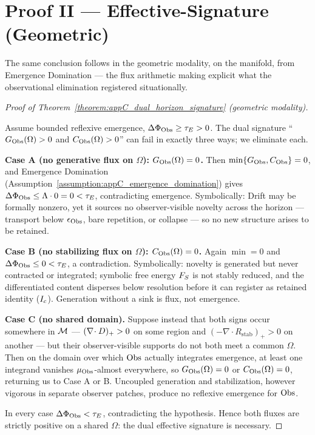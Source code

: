 \section{Proof II --- Effective-Signature (Geometric)} \label{sec:appC_proof_by_elimination}
The same conclusion follows in the geometric modality, on the manifold, from Emergence
Domination --- the flux arithmetic making explicit what the observational elimination
registered situationally.
\begin{proof}[Proof of Theorem~\ref{theorem:appC_dual_horizon_signature} (geometric modality)]
\label{proof:appC_dual_horizon_signature_geometric}
\leavevmode

Assume bounded reflexive emergence, \(\Delta\Phi_{\mathrm{Obs}}\ge\tau_E>0\). The dual
signature ``\(G_{\mathrm{Obs}}(\Omega)>0\) and \(C_{\mathrm{Obs}}(\Omega)>0\)'' can fail in exactly
three ways; we eliminate each.

\textbf{Case A (no generative flux on \(\Omega\)): \(G_{\mathrm{Obs}}(\Omega)=0\).} Then
\(\min\{G_{\mathrm{Obs}},C_{\mathrm{Obs}}\}=0\), and Emergence Domination
(Assumption~\ref{assumption:appC_emergence_domination}) gives
\(\Delta\Phi_{\mathrm{Obs}}\le \Lambda\cdot 0 = 0 < \tau_E\), contradicting emergence.
Symbolically: Drift may be formally nonzero, yet it sources no observer-visible
novelty across the horizon --- transport below \(\epsilon_{\mathrm{Obs}}\), bare repetition,
or collapse --- so no new structure arises to be retained.

\textbf{Case B (no stabilizing flux on \(\Omega\)): \(C_{\mathrm{Obs}}(\Omega)=0\).} Again
\(\min=0\) and \(\Delta\Phi_{\mathrm{Obs}}\le 0<\tau_E\), a contradiction. Symbolically:
novelty is generated but never contracted or integrated; symbolic free energy
\(F_S\) is not stably reduced, and the differentiated content disperses below
resolution before it can register as retained identity (\(I_c\)). Generation
without a sink is flux, not emergence.

\textbf{Case C (no shared domain).} Suppose instead that both signs occur somewhere
in \(\mathcal{M}\) --- \((\nabla\!\cdot D)_+>0\) on some region and
\((-\nabla\!\cdot R_{\mathrm{stab}})_+>0\) on another --- but their observer-visible
supports do not both meet a common \(\Omega\). Then on the domain over which \(\mathrm{Obs}\)
actually integrates emergence, at least one integrand vanishes
\(\mu_{\mathrm{Obs}}\)-almost everywhere, so \(G_{\mathrm{Obs}}(\Omega)=0\) or
\(C_{\mathrm{Obs}}(\Omega)=0\), returning us to Case A or B. Uncoupled generation and
stabilization, however vigorous in separate observer patches, produce no reflexive
emergence for \(\mathrm{Obs}\).

In every case \(\Delta\Phi_{\mathrm{Obs}}<\tau_E\), contradicting the hypothesis. Hence both
fluxes are strictly positive on a shared \(\Omega\): the dual effective signature is
necessary.
\end{proof}

